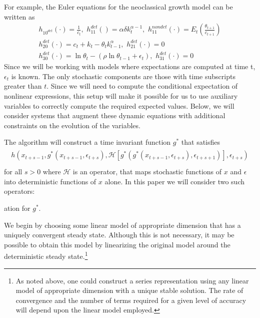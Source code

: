 \documentclass[12pt]{article}
\begin{document}
For example, the Euler equations for the  neoclassical growth  model 
\label{sec:simple-rbc-model-ext} can be written as
\begin{gather}
h_{10^{det}}(\cdot)=\frac{1}{c_t},\,\,
h_{11}^{det}()=\alpha \delta k_{t}^{\alpha-1} ,\,\,
h_{11}^{nondet}(\cdot)=E_t \left (\frac{\theta_{t+1}}{c_{t+1}} \right )\\
h_{20}^{det}(\cdot)=c_t + k_t-\theta_tk_{t-1}^\alpha,\,\,
h_{21}^{det}(\cdot)=0\\
h_{30}^{det}(\cdot)=\ln \theta_t -(\rho \ln \theta_{t-1} + \epsilon_t),\,\,
h_{31}^{det}(\cdot)=0
\end{gather}
Since we will be working with models where expectations are computed at time t, $\epsilon_t$ is known.  The only stochastic components are those with time subscripts greater than $t$. Since we will need to compute 
the conditional expectation of nonlinear expressions,  
this setup will make it possible for us to use auxiliary
variables to correctly compute the required expected values.
Below, we will consider 
systems that augment these dynamic equations with additional constraints 
on the evolution of the variables.


The algorithm will construct
 a time invariant function $g^\ast$ that satisfies
\begin{gather}
  \begin{split}
h(x_{t+s-1},g^\ast(x_{t+s-1},\epsilon_{t+s}),\mathcal{H}[g^\ast(g^\ast(x_{t+s-1},\epsilon_{t+s}),\epsilon_{t+s+1})],\epsilon_{t+s}) \label{theProblem} \\
  \end{split}
 \end{gather}
 for all $s>0$ where $\mathcal{H}$ is an operator, 
  that maps stochastic functions of $x$ and $\epsilon$ into deterministic 
functions of $x$ alone.  In this paper we will consider two such operators:



ation for $g^\ast$.






We begin by choosing some linear model of appropriate dimension that 
has a uniquely convergent steady state.  
Although this is not necessary, it may be possible to obtain this model by
linearizing the original model around the deterministic steady state.\footnote{As noted above, one could construct a series representation using any linear
 model of appropriate dimension with a unique stable solution.  The rate of convergence and the number of terms required for a  given level of accuracy will depend upon the linear model employed.}
\end{document}
